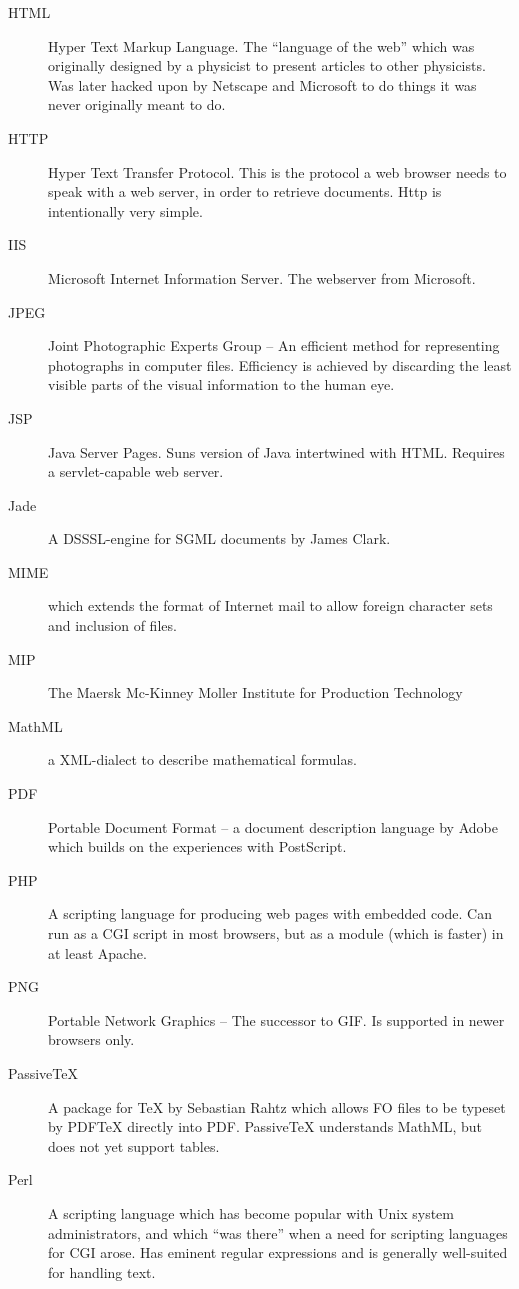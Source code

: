 \begin{description}
\item[HTML] Hyper Text Markup Language.  The ``language of the web'' which was originally designed by a physicist to present articles to other physicists.  Was later hacked upon by Netscape and Microsoft to do things it was never originally meant to do.
\item[HTTP] Hyper Text Transfer Protocol.  This is the protocol a web browser needs to speak with a web server, in order to retrieve documents.  Http is intentionally very simple.
\item[IIS] Microsoft Internet Information Server.  The webserver from Microsoft.
\item[JPEG] Joint Photographic Experts Group -- An efficient method for representing photographs in computer files.  Efficiency is achieved by discarding the least visible parts of the visual information to the human eye.
\item[JSP] Java Server Pages.  Suns version of Java intertwined with HTML.  Requires a servlet-capable web server.
\item[Jade] A DSSSL-engine for SGML documents by James Clark.
\item[MIME] {} which extends the format of Internet mail to allow foreign character sets and inclusion of files.
\item[MIP] The Maersk Mc-Kinney Moller Institute for Production Technology
\item[MathML] a XML-dialect to describe mathematical formulas.
\item[PDF] Portable Document Format -- a document description language by Adobe which builds on the experiences with PostScript.
\item[PHP] A scripting language for producing web pages with embedded code.  Can run as a CGI script in most browsers, but as a module (which is faster) in at least Apache.
\item[PNG] Portable Network Graphics -- The successor to GIF.  Is supported in newer browsers only.
\item[PassiveTeX] A package for {\TeX} by Sebastian Rahtz which allows FO files to be typeset by PDF{\TeX} directly into PDF.  PassiveTeX understands MathML, but does not yet support tables.
\item[Perl] A scripting language which has become popular with Unix system administrators, and which ``was there'' when a need for scripting languages for CGI arose.  Has eminent regular expressions and is generally well-suited for handling text.

\end{description}
